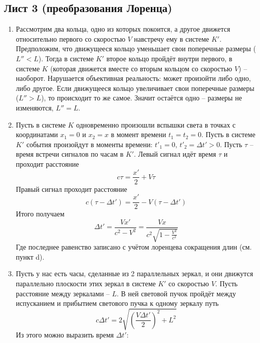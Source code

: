 \documentclass[12pt]{article}
\begin{document}
    \subsection{Лист 3 (преобразования Лоренца)}
    \begin{enumerate}
        \item Рассмотрим два кольца, одно из которых покоится, а другое движется относительно первого со скоростью $V$ навстречу ему в системе $K'$. Предположим, что движущееся кольцо уменьшает свои поперечные размеры ($L''<L$). Тогда в системе $K'$ второе кольцо пройдёт внутри первого, в системе $K$ (которая движется вместе со вторым кольцом со скоростью $V$) -- наоборот. Нарушается объективная реальность: может произойти либо одно, либо другое. Если движущееся кольцо увеличивает свои поперечные размеры ($L''>L$), то происходит то же самое. Значит остаётся одно -- размеры не изменяются, $L''=L$.
        \item Пусть в системе $K$ одновременно произошли вспышки света в точках с координатами $x_1=0$ и $x_2=x$ в момент времени $t_1=t_2=0$. Пусть в системе $K'$ события произойдут в моменты времени: $t'_1=0$, $t'_2=\Delta t'>0$. Пусть $\tau$ -- время встречи сигналов по часам в $K'$. Левый сигнал идёт время $\tau$ и проходит расстояние
        \begin{equation}
            c\tau=\frac{x'}{2}+V\tau
        \end{equation}
        Правый сигнал проходит расстояние
        \begin{equation}
            c(\tau-\Delta t')=\frac{x'}{2}-V(\tau-\Delta t')
        \end{equation}
        Итого получаем
        \begin{equation}
            \Delta t'=\frac{Vx'}{c^2-V^2}=\frac{Vx}{c^2\sqrt{1-\frac{V^2}{c^2}}}
        \end{equation}
        Где последнее равенство записано с учётом лоренцева сокращения длин (см. пункт d).
        \item Пусть у нас есть часы, сделанные из 2 параллельных зеркал, и они движутся параллельно плоскости этих зеркал в системе $K'$ со скоростью $V$. Пусть расстояние между зеркалами -- $L$. В ней световой пучок пройдёт между испусканием и прибытием светового пучка к одному зеркалу путь
        \begin{equation}
            c\Delta t' = 2\sqrt{\left(\frac{V\Delta t'}{2}\right)^2+L^2}
        \end{equation}
        Из этого можно выразить время $\Delta t'$:

\end{enumerate}
\end{document}
